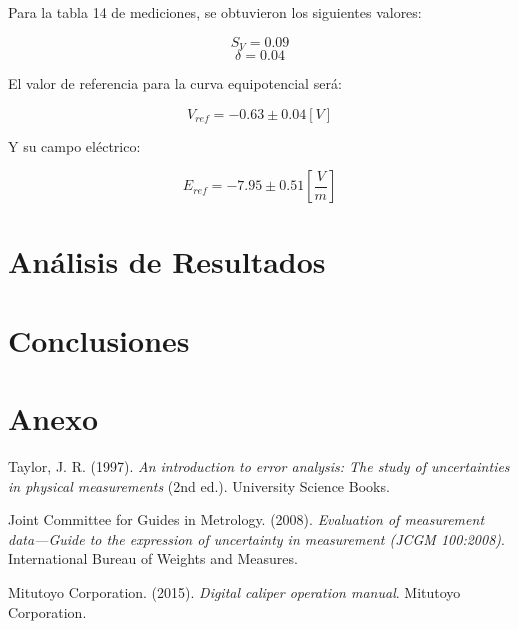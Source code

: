 \documentclass[11pt,twocolumn]{article}
\begin{document}
Para la tabla 14 de mediciones, se obtuvieron los siguientes valores:

\[S_V = 0.09\]
\[\delta = 0.04\]

El valor de referencia para la curva equipotencial será:

\[V_{ref} = -0.63 \pm 0.04 [V]\]

Y su campo eléctrico:

\[E_{ref} = -7.95 \pm 0.51 [\frac{V}{m}]\]


\section{Análisis de Resultados}

\section{Conclusiones}

\section{Anexo}

\begin{thebibliography}{9}

 Taylor, J. R. (1997). \textit{An introduction to error analysis: The study of uncertainties in physical measurements} (2nd ed.). University Science Books.

 Joint Committee for Guides in Metrology. (2008). \textit{Evaluation of measurement data—Guide to the expression of uncertainty in measurement (JCGM 100:2008)}. International Bureau of Weights and Measures.

 Mitutoyo Corporation. (2015). \textit{Digital caliper operation manual}. Mitutoyo Corporation.

\end{thebibliography}
\end{document}

